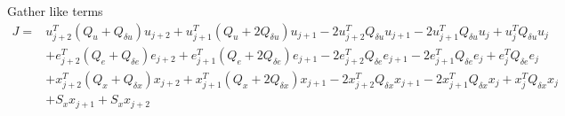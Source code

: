 \documentclass[landscape]{article}
\begin{document}
Gather like terms
\begin{align}
J =
&  u_{j+2}^T ( Q_u +   Q_{\delta u} ) u_{j+2} 
+  u_{j+1}^T ( Q_u + 2 Q_{\delta u} ) u_{j+1}  
-  2 u_{j+2}^T Q_{\delta u} u_{j+1}
-  2 u_{j+1}^T Q_{\delta u} u_{j}   +   u_{j}^T Q_{\delta u} u_{j}   \\
& +e_{j+2}^T ( Q_e +   Q_{\delta e} ) e_{j+2} 
+  e_{j+1}^T ( Q_e + 2 Q_{\delta e} ) e_{j+1}  
-  2 e_{j+2}^T Q_{\delta e} e_{j+1} 
-  2 e_{j+1}^T Q_{\delta e} e_{j}   +   e_{j}^T Q_{\delta e} e_{j}   \\
&+ x_{j+2}^T ( Q_x +   Q_{\delta x} ) x_{j+2} 
+  x_{j+1}^T ( Q_x + 2 Q_{\delta x} ) x_{j+1} 
-  2 x_{j+2}^T Q_{\delta x} x_{j+1} 
-  2 x_{j+1}^T Q_{\delta x} x_{j}   +   x_{j}^T Q_{\delta x} x_{j}   \\
& + S_x x_{j+1} + S_x x_{j+2}
\end{align}
\end{document}
